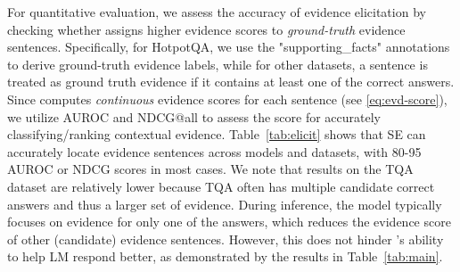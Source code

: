 \begin{table}[h]
\footnotesize
\centering
\caption{\se accurately identifies contextual evidence sentences across different datasets and models.}
\label{tab:elicit}
\vspace{-5pt}
\vspace{-10pt}
\end{table}

For quantitative evaluation, we assess the accuracy of evidence elicitation by checking whether \se assigns higher evidence scores to \textit{ground-truth} evidence sentences. 
Specifically, for HotpotQA, we use the "supporting\_facts" annotations to derive ground-truth evidence labels, while for other datasets, a sentence is treated as ground truth evidence if it contains at least one of the correct answers.
Since \se computes \textit{continuous} evidence scores for each sentence (see \eqref{eq:evd-score}), we utilize AUROC and NDCG@all to assess the score for accurately classifying/ranking contextual evidence.
Table~\ref{tab:elicit} shows that SE can accurately locate evidence sentences across models and datasets, with 80-95 AUROC or NDCG scores in most cases. We note that results on the TQA dataset are relatively lower because TQA often has multiple candidate correct answers and thus a larger set of evidence. During inference, the model typically focuses on evidence for only one of the answers, which reduces the evidence score of other (candidate) evidence sentences. However, this does not hinder \se's ability to help LM respond better, as demonstrated by the results in Table~\ref{tab:main}.

